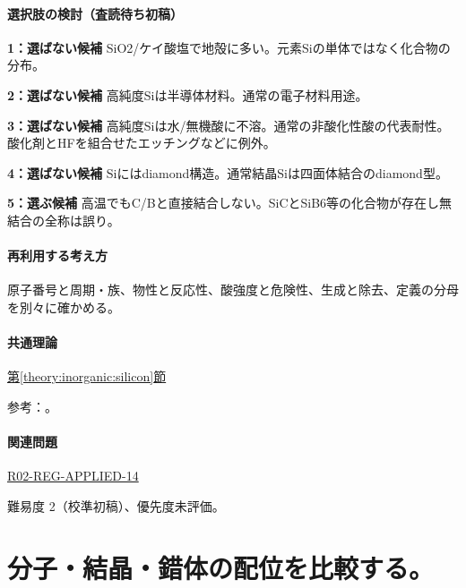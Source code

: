 \paragraph{選択肢の検討（査読待ち初稿）}\mbox{}\par

\noindent\textbf{1：選ばない候補} SiO2/ケイ酸塩で地殻に多い。元素Siの単体ではなく化合物の分布。\par

\noindent\textbf{2：選ばない候補} 高純度Siは半導体材料。通常の電子材料用途。\par

\noindent\textbf{3：選ばない候補} 高純度Siは水/無機酸に不溶。通常の非酸化性酸の代表耐性。酸化剤とHFを組合せたエッチングなどに例外。\par

\noindent\textbf{4：選ばない候補} Siにはdiamond構造。通常結晶Siは四面体結合のdiamond型。\par

\noindent\textbf{5：選ぶ候補} 高温でもC/Bと直接結合しない。SiCとSiB6等の化合物が存在し無結合の全称は誤り。\par

\paragraph{再利用する考え方} 原子番号と周期・族、物性と反応性、酸強度と危険性、生成と除去、定義の分母を別々に確かめる。

\paragraph{共通理論} \hyperref[theory:inorganic:silicon]{第\ref*{theory:inorganic:silicon}節}

\par 参考：\cite{inorganic_metalloid_ref,inorganic_sic,inorganic_sib6,inorganic_hf_etch}。

\paragraph{関連問題} \hyperref[q:r02-reg-applied-14]{R02-REG-APPLIED-14}

\par 難易度 2（校準初稿）、優先度未評価。

\section{分子・結晶・錯体の配位を比較する。}

